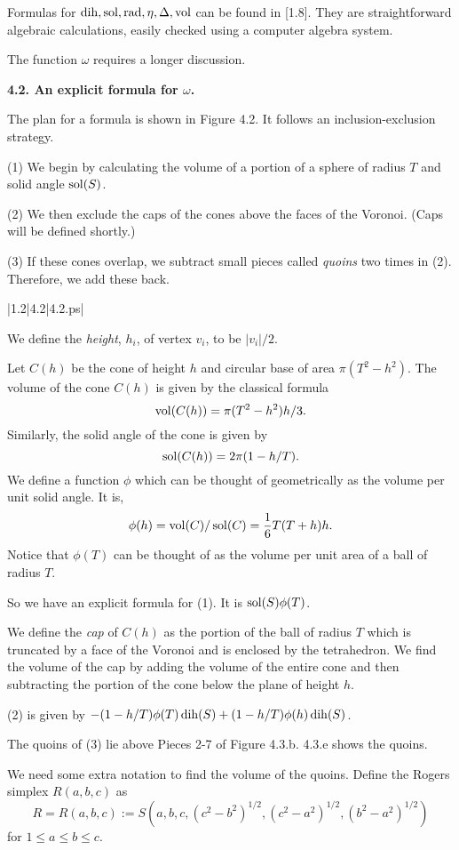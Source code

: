 Formulas for $\operatorname{dih}, \operatorname{sol}, \operatorname{rad}, \eta, \Delta, \operatorname{vol}$  can be found in [1.8].  
They are straightforward algebraic calculations,
 easily checked using a computer algebra system.

The function $\omega$ requires a longer discussion.

\bigskip

{\bf 4.2.  An explicit formula for $\omega$.}

\bigskip

The plan for a formula is shown in Figure 4.2.  It follows an inclusion-exclusion strategy. 

(1) We begin by calculating the volume of a portion of a sphere of radius $T$ and solid 
angle $\operatorname{sol}(S)$.  

(2) We then exclude the 
caps of the cones above the faces of the Voronoi.  (Caps will be defined shortly.)

(3) If these cones 
overlap, we subtract small pieces called {\it quoins} two times in (2).
  Therefore, we add these back.  


\gram|1.2|4.2|4.2.ps|  %


We define the {\it height}, $h_i$, of vertex $v_i$, to be $|v_i|/2$.

Let $C(h)$ be the cone of height $h$ and circular base of area 
$\pi (T^2-h^2)$.
The volume of the cone $C(h)$ is given by the classical formula $$\operatorname{vol}(C(h))=\pi (T^2-h^2) h/3.$$ 
 Similarly, the solid angle of the cone is given by $$\operatorname{sol}(C(h))=2\pi (1-h/T).$$ 
 We define a function $\phi$ which can be thought of geometrically as the volume per 
unit solid angle.  It is, $$\phi(h)=\operatorname{vol}(C)/\operatorname{sol}(C)=\frac 1 6 T(T+h)h.$$  Notice that 
$\phi(T)$ can be thought of as the volume per unit area of a ball of radius $T$.  

So we have an explicit formula for (1).  It is 
$\operatorname{sol}(S)\phi(T)$.  

We define the {\it cap} of $C(h)$ as the portion of the ball of radius $T$ 
which is truncated by a face of the Voronoi and is enclosed by the tetrahedron.
We find the volume of the cap by adding the volume of the entire cone and then 
subtracting the portion of the cone below the plane of height $h$.

(2) is given by
$-(1-h/T)\phi(T)\operatorname{dih}(S)+(1-h/T)\phi(h)\operatorname{dih}(S)$.

The quoins of (3) lie above Pieces 2-7 of Figure 4.3.b.  4.3.e shows the quoins.  

We need some extra notation to find the volume of the quoins.
Define the Rogers simplex $R(a,b,c)$ as 
$$R=R(a,b,c):= S(a,b,c,(c^2-b^2)^{1/2},(c^2-a^2)^{1/2},(b^2-a^2)^{1/2})$$
for $1\le a\le b\le c$.

